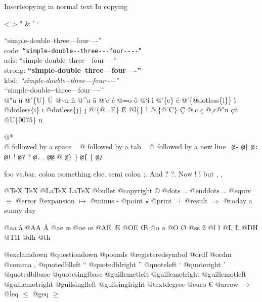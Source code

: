 \documentclass{book}
\begin{document}
\label{anchor:Top}




Insertcopying in normal text
In copying

<
>
"
\&
'
`

``simple-double--three---four----''\leavevmode{}\\
code: \texttt{``simple-double{-}{-}three{-}{-}{-}four{-}{-}{-}-''} \leavevmode{}\\
asis: ``simple-double--three---four----'' \leavevmode{}\\
strong: \textbf{``simple-double--three---four----''} \leavevmode{}\\
kbd: {\ttfamily\textsl{``simple-double{-}{-}three{-}{-}{-}four{-}{-}{-}-''}} \leavevmode{}\\

`\hbox{}`simple-double-\hbox{}-three---four----'\hbox{}'\leavevmode{}\\


@"u \"{u} 
@"\{U\} \"{U} 
@\~{}n \~{n}
@\^{}a \^{a}
@'e \'{e}
@=o \={o}
@`i \`{i}
@'\{e\} \'{e}
@'\{@dotless\{i\}\} \'{\i{}} 
@dotless\{i\} \i{}
@dotless\{j\} \j{}
@`\{@=E\} \`{\={E}} 
@l\{\} \l{}
@,\{@'C\} \c{\'{C}}
@,c \c{c}
@,c@"u \c{c}\"{u} \leavevmode{}\\

@U\{0075\} u

@* \leavevmode{}\\
@ followed by a space
\ {}
@ followed by a tab
\ {}
@ followed by a new line
\ {}\texttt{@-} \-{}
\texttt{@|} 
\texttt{@:} \@
\texttt{@!} \@!
\texttt{@?} \@?
\texttt{@.} \@.
\texttt{@@} @
\texttt{@\}} \}
\texttt{@\{} \{
\texttt{@/} 

foo vs.\@ bar. 
colon :\@And something else.
semi colon ;\@.
And ? ?\@.
Now ! !\@@
but , ,\@

@TeX \TeX{}
@LaTeX \LaTeX{}
@bullet \textbullet{}
@copyright \copyright{}
@dots \dots{}\@
@enddots \dots{}
@equiv $\equiv{}$
@error 
@expansion $\mapsto{}$
@minus -
@point $\star{}$
@print $\dashv{}$
@result $\Rightarrow{}$
@today a sunny day

@aa \aa{}
@AA \AA{}
@ae \ae{}
@oe \oe{}
@AE \AE{}
@OE \OE{}
@o \o{}
@O \O{}
@ss \ss{}
@l \l{}
@L \L{}
@DH \DH{}
@TH \TH{}
@dh \dh{}
@th \th{}

@exclamdown \textexclamdown{}
@questiondown \textquestiondown{}
@pounds \textsterling{}
@registeredsymbol \circledR{}
@ordf \textordfeminine{}
@ordm \textordmasculine{}
@comma ,
@quotedblleft \textquotedblleft{}
@quotedblright \textquotedblright{}
@quoteleft \textquoteleft{}
@quoteright \textquoteright{}
@quotedblbase \quotedblbase{}
@quotesinglbase \quotesinglbase{}
@guillemetleft \guillemotleft{}
@guillemetright \guillemotright{}
@guillemotleft \guillemotleft{}
@guillemotright \guillemotright{}
@guilsinglleft \guilsinglleft{}
@guilsinglright \guilsinglright{}
@textdegree \textdegree{}
@euro \euro{}
@arrow $\rightarrow{}$
@leq $\leq{}$
@geq $\geq{}$
\end{document}
